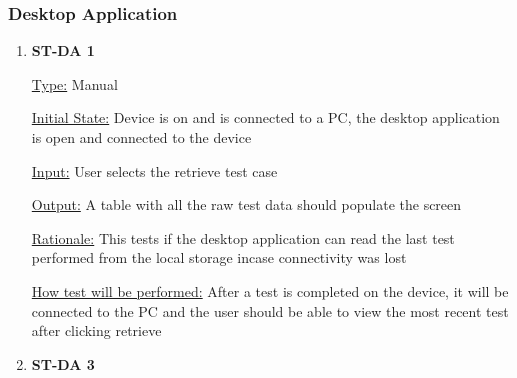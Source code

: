 \documentclass[12pt, titlepage]{article}
\begin{document}
\newpage
\subsubsection{Desktop Application}

\begin{enumerate}
  
  \item{\bf{ST-DA 1}}
  
  \underline{Type:} Manual
            
  \underline{Initial State:} Device is on and is connected to a PC, the desktop application is open and connected to the device
            
  \underline{Input:} User selects the retrieve test case
            
  \underline{Output:} A table with all the raw test data should populate the screen
  
  \underline{Rationale:} This tests if the desktop application can read the last test performed from the local storage incase connectivity was lost 
            
  \underline{How test will be performed:} After a test is completed on the device, it will be connected to the PC and the user should be able to view the most recent test after clicking retrieve\\

  
            
            
            
  
            

  \item{\bf{ST-DA 3}}
  

\end{enumerate}
\end{document}
